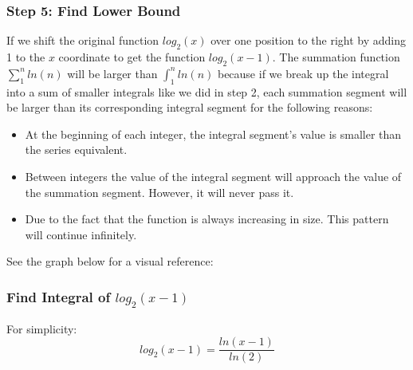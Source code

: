 \documentclass[10pt,a4paper]{article}
\theoremstyle{definition}
\begin{document}
\subsubsection{Step 5: Find Lower Bound}
If we shift the original function $log_2(x)$ over one position to the right by adding 1 to the $x$ coordinate to get the function $log_2(x-1)$. The summation function $\sum_1^n ln(n)$ will be larger than $\int_1^n ln(n)$ because if we break up the integral into a sum of smaller integrals like we did in step 2, each summation segment will be larger than its corresponding integral segment for the following reasons:
\begin{itemize}
  \item At the beginning of each integer, the integral segment's value is smaller than the series equivalent.
  \item Between integers the value of the integral segment will approach the value of the summation segment. However, it will never pass it.
  \item Due to the fact that the function is always increasing in size. This pattern will continue infinitely.
\end{itemize}
See the graph below for a visual reference:


\subsubsection{Find Integral of $log_2(x-1)$}
For simplicity:
\begin{equation*}
  log_2(x-1) = \frac{ln(x-1)}{ln(2)}
\end{equation*}
\end{document}
